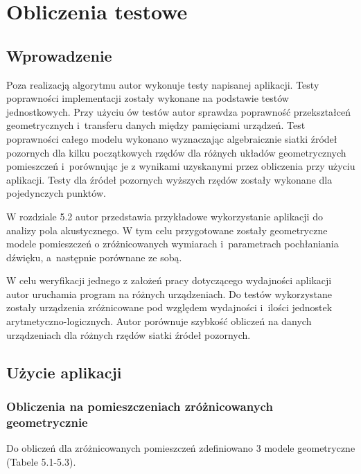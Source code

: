 \chapter{Obliczenia testowe}\label{cha:ot}



\section{Wprowadzenie}\label{sec:wprowadzenie}


Poza realizacją algorytmu autor wykonuje testy napisanej aplikacji. Testy poprawności implementacji zostały wykonane na podstawie testów jednostkowych. Przy użyciu ów testów autor sprawdza poprawność przekształceń geometrycznych i~transferu danych między pamięciami urządzeń. Test poprawności całego modelu wykonano wyznaczając algebraicznie siatki źródeł pozornych dla kilku początkowych rzędów dla różnych układów geometrycznych pomieszczeń i~porównując je z wynikami uzyskanymi przez obliczenia przy użyciu aplikacji. Testy dla źródeł pozornych wyższych rzędów zostały wykonane dla pojedynczych punktów.

W rozdziale 5.2 autor przedstawia przykładowe wykorzystanie aplikacji do analizy pola akustycznego. W tym celu przygotowane zostały geometryczne modele pomieszczeń o zróżnicowanych wymiarach i~parametrach pochłaniania dźwięku, a~następnie  porównane ze sobą.

W celu weryfikacji jednego z założeń pracy dotyczącego wydajności aplikacji autor uruchamia program na różnych urządzeniach. Do testów wykorzystane zostały urządzenia  zróżnicowane pod względem wydajności i~ilości jednostek arytmetyczno-logicznych. Autor porównuje szybkość obliczeń na danych urządzeniach dla różnych rzędów siatki źródeł pozornych. 

\section{Użycie aplikacji}\label{sec:asdasd}

\subsection{Obliczenia na pomieszczeniach zróżnicowanych geometrycznie}\label{sec:imstest1}

Do obliczeń dla zróżnicowanych pomieszczeń zdefiniowano 3 modele geometryczne (Tabele 5.1-5.3).


